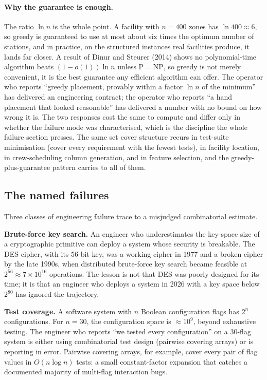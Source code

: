 \paragraph{Why the guarantee is enough.}
The ratio $\ln n$ is the whole point. A facility with $n = 400$ zones
has $\ln 400 \approx 6$, so greedy is guaranteed to use at most about
six times the optimum number of stations, and in practice, on the
structured instances real facilities produce, it lands far closer. A
result of Dinur and Steurer (2014) shows no polynomial-time algorithm
beats $(1 - o(1)) \ln n$ unless $\mathrm{P} = \mathrm{NP}$, so greedy
is not merely convenient, it is the best guarantee any
efficient algorithm can offer. The operator who reports ``greedy
placement, provably within a factor $\ln n$ of the minimum'' has
delivered an engineering contract; the operator who reports ``a hand
placement that looked reasonable'' has delivered a number with no
bound on how wrong it is. The two responses cost the same to compute
and differ only in whether the failure mode was characterised, which
is the discipline the whole failure section presses. The same set
cover structure recurs in test-suite minimisation (cover every
requirement with the fewest tests), in facility location, in
crew-scheduling column generation, and in feature selection, and the
greedy-plus-guarantee pattern carries to all of them.



\subsection{The named failures}

Three classes of engineering failure trace to a misjudged
combinatorial estimate.

\textbf{Brute-force key search.} An engineer who underestimates the
key-space size of a cryptographic primitive can deploy a system
whose security is breakable. The DES cipher, with its $56$-bit key,
was a working cipher in 1977 and a broken cipher by the late 1990s,
when distributed brute-force key search became feasible at $2^{56}
\approx 7 \times 10^{16}$ operations. The lesson is not that DES
was poorly designed for its time; it is that an engineer who
deploys a system in 2026 with a key space below $2^{80}$ has
ignored the trajectory.

\textbf{Test coverage.} A software system with $n$ Boolean
configuration flags has $2^{n}$ configurations. For $n = 30$, the
configuration space is $\approx 10^{9}$, beyond exhaustive
testing. The engineer who reports ``we tested every configuration''
on a $30$-flag system is either using combinatorial test design
(pairwise covering arrays) or is reporting in error. Pairwise
covering arrays, for example, cover every pair of flag values in
$O(n \log n)$ tests: a small constant-factor expansion that
catches a documented majority of multi-flag interaction bugs.

